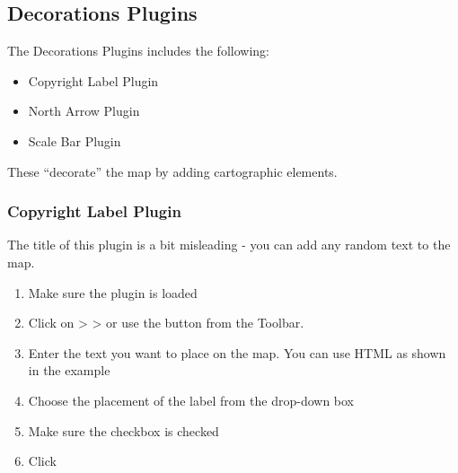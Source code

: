 
\subsection{Decorations Plugins}

\updatedisclaimer

The Decorations Plugins includes the following:

\begin{itemize}
\item Copyright Label Plugin
\item North Arrow Plugin
\item Scale Bar Plugin
\end{itemize}
 
These ``decorate'' the map by adding cartographic elements. 

\subsubsection{Copyright Label Plugin}


The title of this plugin is a bit misleading - you can add any random text to the map.

\begin{enumerate}
\item Make sure the plugin is loaded
\item Click on  >  >  or use the  button from the Toolbar.
\item Enter the text you want to place on the map. You can use HTML as
  shown in the example
\item Choose the placement of the label from the  drop-down box
\item Make sure the  checkbox is checked
\item Click  
\end{enumerate}

